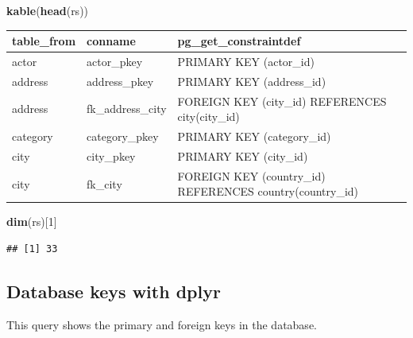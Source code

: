 \documentclass[]{book}
\newenvironment{Shaded}{\begin{snugshade}}{\end{snugshade}}
\newcommand{\DecValTok}[1]{\textcolor[rgb]{0.00,0.00,0.81}{#1}}
\newcommand{\KeywordTok}[1]{\textcolor[rgb]{0.13,0.29,0.53}{\textbf{#1}}}
\newcommand{\NormalTok}[1]{#1}
\theoremstyle{definition}
\theoremstyle{definition}
\theoremstyle{definition}
\theoremstyle{remark}
\begin{document}
\begin{Shaded}
\begin{Highlighting}[]
\KeywordTok{kable}\NormalTok{(}\KeywordTok{head}\NormalTok{(rs))}
\end{Highlighting}
\end{Shaded}

\begin{tabular}{l|l|l}
\hline
table\_from & conname & pg\_get\_constraintdef\\
\hline
actor & actor\_pkey & PRIMARY KEY (actor\_id)\\
\hline
address & address\_pkey & PRIMARY KEY (address\_id)\\
\hline
address & fk\_address\_city & FOREIGN KEY (city\_id) REFERENCES city(city\_id)\\
\hline
category & category\_pkey & PRIMARY KEY (category\_id)\\
\hline
city & city\_pkey & PRIMARY KEY (city\_id)\\
\hline
city & fk\_city & FOREIGN KEY (country\_id) REFERENCES country(country\_id)\\
\hline
\end{tabular}

\begin{Shaded}
\begin{Highlighting}[]
\KeywordTok{dim}\NormalTok{(rs)[}\DecValTok{1}\NormalTok{]}
\end{Highlighting}
\end{Shaded}

\begin{verbatim}
## [1] 33
\end{verbatim}

\hypertarget{database-keys-with-dplyr}{%
\subsection{Database keys with dplyr}\label{database-keys-with-dplyr}}

This query shows the primary and foreign keys in the database.
\end{document}
